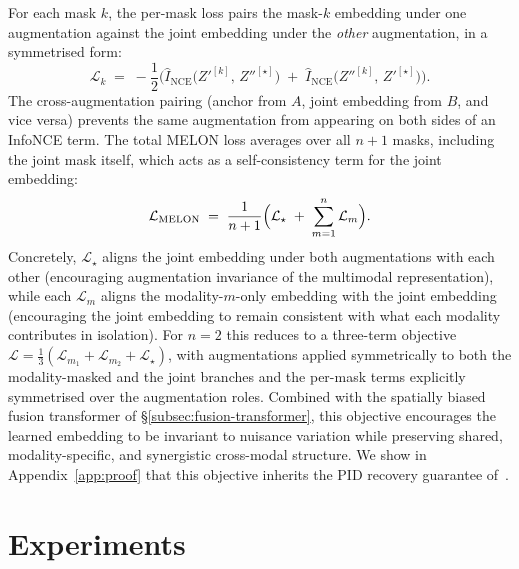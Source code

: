 \documentclass{article}
\theoremstyle{plain}
\theoremstyle{definition}
\begin{document}
For each mask $k$, the per-mask loss pairs the mask-$k$ embedding under one augmentation against the joint embedding under the \emph{other} augmentation, in a symmetrised form:
\begin{equation}
  \label{eq:melon-perk}
  \mathcal{L}_k
  \;=\;
  -\frac{1}{2}\Big(
    \widehat{I}_{\mathrm{NCE}}\bigl(Z'^{[k]},\, Z''^{[\star]}\bigr)
    \;+\;
    \widehat{I}_{\mathrm{NCE}}\bigl(Z''^{[k]},\, Z'^{[\star]}\bigr)
  \Big).
\end{equation}
The cross-augmentation pairing (anchor from $A$, joint embedding from $B$, and vice versa) prevents the same augmentation from appearing on both sides of an InfoNCE term. The total MELON loss averages over all $n+1$ masks, including the joint mask itself, which acts as a self-consistency term for the joint embedding:
\begin{equation}
  \label{eq:melon-loss}
    \mathcal{L}_{\mathrm{MELON}}
    \;=\;
    \frac{1}{n+1}\Bigl(
      \mathcal{L}_{\star}
      \;+\;
      \sum_{m=1}^{n} \mathcal{L}_{m}
    \Bigr).
\end{equation}
Concretely, $\mathcal{L}_{\star}$ aligns the joint embedding under both augmentations with each other (encouraging augmentation invariance of the multimodal representation), while each $\mathcal{L}_{m}$ aligns the modality-$m$-only embedding with the joint embedding (encouraging the joint embedding to remain consistent with what each modality contributes in isolation). For $n = 2$ this reduces to a three-term objective $\mathcal{L} = \tfrac{1}{3}(\mathcal{L}_{m_1} + \mathcal{L}_{m_2} + \mathcal{L}_{\star})$, with augmentations applied symmetrically to both the modality-masked and the joint branches and the per-mask terms explicitly symmetrised over the augmentation roles. Combined with the spatially biased fusion transformer of \S\ref{subsec:fusion-transformer}, this objective encourages the learned embedding to be invariant to nuisance variation while preserving shared, modality-specific, and synergistic cross-modal structure. We show in Appendix~\ref{app:proof} that this objective inherits the PID recovery guarantee of~\citet{dufumier2024align}.

\section{Experiments}
\end{document}
